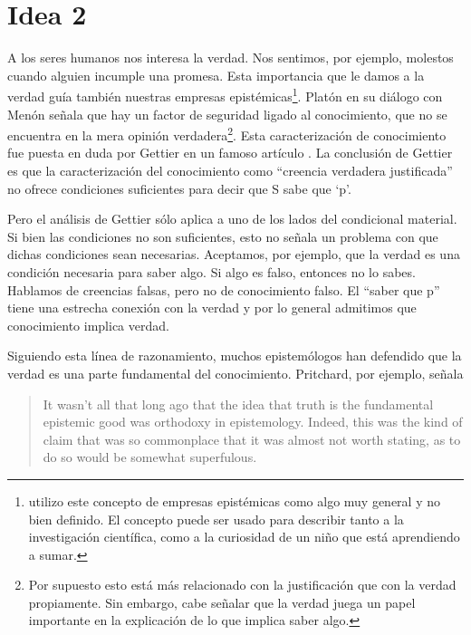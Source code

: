 \documentclass[12pt]{article}
\begin{document}
\section{Idea 2}

\noindent A los seres humanos nos interesa la verdad. Nos sentimos, por ejemplo, molestos cuando alguien incumple una promesa. Esta importancia que le damos a la verdad guía también nuestras empresas epistémicas\footnote{utilizo este concepto de empresas epistémicas como algo muy general y no bien definido. El concepto puede ser usado para describir tanto a la investigación científica, como a la curiosidad de un niño que está aprendiendo a sumar.}. Platón en su diálogo con Menón \cite[\P\P 97a-98b]{platonmeno} señala que hay un factor de seguridad ligado al conocimiento, que no se encuentra en la mera opinión verdadera\footnote{Por supuesto esto está más relacionado con la justificación que con la verdad propiamente. Sin embargo, cabe señalar que la verdad juega un papel importante en la explicación de lo que implica saber algo.}. Esta caracterización de conocimiento fue puesta en duda por Gettier en un famoso artículo \citeyear{Gettier}. La conclusión de Gettier es que la caracterización del conocimiento como ``creencia verdadera justificada'' no ofrece condiciones suficientes para decir que S sabe que `p'.

Pero el análisis de Gettier sólo aplica a uno de los lados del condicional material. Si bien las condiciones no son suficientes, esto no señala un problema con que dichas condiciones sean necesarias. Aceptamos, por ejemplo, que la verdad es una condición necesaria para saber algo. Si algo es falso, entonces no lo sabes. Hablamos de creencias falsas, pero no de conocimiento falso. El ``saber que p'' tiene una estrecha conexión con la verdad y por lo general admitimos que conocimiento implica verdad. 

Siguiendo esta línea de razonamiento, muchos epistemólogos han defendido que la verdad es una parte fundamental del conocimiento. Pritchard, por ejemplo, señala  

\begin{quote}
It wasn’t all that long ago that the idea that truth is the fundamental epistemic good was orthodoxy in epistemology. Indeed, this was the kind of claim that was so commonplace that it was almost not worth stating, as to do so would be somewhat superfulous. \cite[p. 1]{Pritchard2021}
\end{quote}
\end{document}

